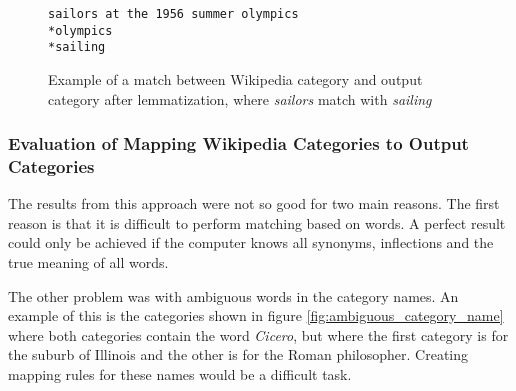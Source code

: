 \begin{figure}[h]
\centering
\begin{lstlisting}
sailors at the 1956 summer olympics
*olympics
*sailing
\end{lstlisting}
\caption[Example of match after lemmatization]{Example of a match between Wikipedia category and output category after lemmatization, where \emph{sailors} match with \emph{sailing}}
\label{fig:catmapping_lemmamatch}
\end{figure}

\begin{comment}
\subsubsection{Categories not relevant for classification}
Not all categories are suitable for classification, some categories are still just relevant for maintaining a well-structured encyclopedia. Example of such categories are \emph{container categories}, which are categories only containing subcategories. All container categories where found by looking at the file asdfasdf  . Some of these categories have already been removed because they are also hidden categories, but a total of 69 023 categories could be disregarded for this purpose. 
\end{comment}

\subsubsection{Evaluation of Mapping Wikipedia Categories to Output Categories}
The results from this approach were not so good for two main reasons. 
The first reason is that it is difficult to perform matching based on words. A perfect result could only be achieved if the computer knows all synonyms, inflections and the true meaning of all words. 

The other problem was with ambiguous words in the category names. An example of this is the categories shown in figure \ref{fig:ambiguous_category_name} where both categories contain the word \emph{Cicero}, but where the first category is for the suburb of Illinois and the other is for the Roman philosopher. Creating mapping rules for these names would be a difficult task. 


